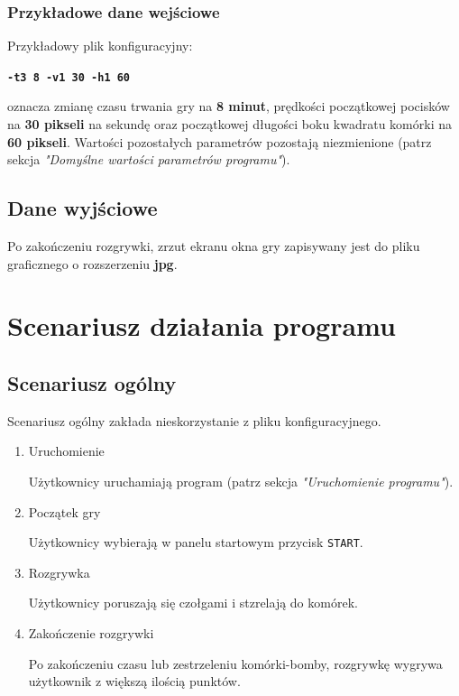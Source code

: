 \documentclass[a4paper]{article}
\begin{document}
\subsubsection{Przyk\l{}adowe dane wej\'sciowe}
Przyk\l{}adowy plik konfiguracyjny:
\begin{center}
\texttt{\textbf{-t3 8 -v1 30 -h1 60}}    
\end{center}
oznacza zmian\k{e} czasu trwania gry na \textbf{8 minut}, pr\k{e}dko\'sci pocz\k{a}tkowej pocisk\'ow na \textbf{30 pikseli} na sekund\k{e} oraz pocz\k{a}tkowej długo\'sci boku kwadratu kom\'orki na \textbf{60 pikseli}. Warto\'sci pozosta\l{}ych parametr\'ow pozostaj\k{a} niezmienione (patrz sekcja \textit{"Domy\'slne warto\'sci parametr\'ow programu"}).



\subsection{Dane wyj\'sciowe}
\quad Po zako\'nczeniu rozgrywki, zrzut ekranu okna gry zapisywany jest do pliku graficznego o rozszerzeniu \textbf{jpg}.


\section{Scenariusz dzia\l{}ania programu}

\subsection{Scenariusz og\'olny}
\quad Scenariusz og\'olny zak\l{}ada nieskorzystanie z pliku konfiguracyjnego.
\begin{enumerate}
    \item Uruchomienie
    
        U\.zytkownicy uruchamiaj\k{a} program (patrz sekcja \textit{"Uruchomienie programu"}).
    \item Pocz\k{a}tek gry
    
        U\.zytkownicy wybieraj\k{a} w panelu startowym przycisk \texttt{START}.
    \item Rozgrywka
    
        U\.zytkownicy poruszaj\k{a} si\k{e} czo\l{}gami i stzrelaj\k{a} do kom\'orek.
    \item Zako\'nczenie rozgrywki
    
        Po zako\'nczeniu czasu lub zestrzeleniu kom\'orki-bomby, rozgrywk\k{e} wygrywa u\.zytkownik z wi\k{e}ksz\k{a} ilo\'sci\k{a} punkt\'ow.
\end{enumerate}
\end{document}
